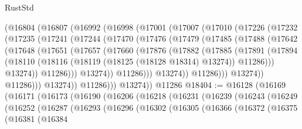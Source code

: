 \begin{lexlean}{RustStd}
\begin{coremodule}
      (@16804
        (@16807
          (@16992
            (@16998
              (@17001
                (@17007
                  (@17010
                    (@17226
                      (@17232
                        (@17235
                          (@17241
                            (@17244
                              (@17470
                                (@17476
                                  (@17479
                                    (@17485
                                      (@17488
                                        (@17642
                                          (@17648
                                            (@17651
                                              (@17657
                                                (@17660
                                                  (@17876
                                                    (@17882
                                                      (@17885
                                                        (@17891
                                                          (@17894
                                                            (@18110
                                                              (@18116
                                                                (@18119
                                                                  (@18125 (@18128 @18314) @13274))
                                                                @11286)))
                                                          @13274))
                                                      @11286)))
                                                @13274))
                                            @11286)))
                                      @13274))
                                  @11286)))
                            @13274))
                        @11286)))
                  @13274))
              @11286)))
        @13274))
    @11286
@18404 := @16128
    (@16169
      (@16171
        (@16173
          (@16190
            (@16206
              (@16218
                (@16231
                  (@16239
                    (@16243
                      (@16249
                        (@16252
                          (@16287
                            (@16293
                              (@16296
                                (@16302
                                  (@16305
                                    (@16366
                                      (@16372
                                        (@16375
                                          (@16381
                                            (@16384

\end{coremodule}
\end{lexlean}
